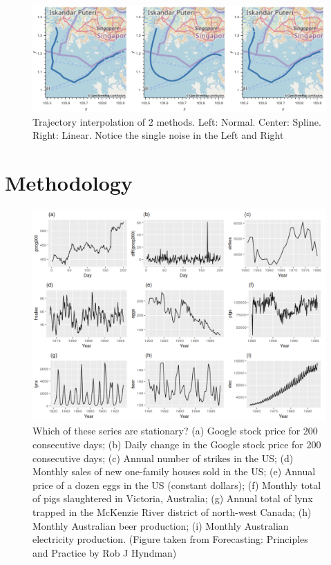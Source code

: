 \begin{figure}[t!]
    \centering
    \includegraphics[width=15cm]{pic/ch-Univariate/interpolations.png}
    \caption{Trajectory interpolation of 2 methods. Left: Normal. Center: Spline. Right: Linear. Notice the single noise in the Left and Right}
    \label{fig:interp}
\end{figure}

\section{Methodology}

\begin{figure}[t!]
    \centering
    \includegraphics[width=15cm]{pic/ch-Univariate/stationary.png}
    \caption{Which of these series are stationary? (a) Google stock price for 200 consecutive days; (b) Daily change in the Google stock price for 200 consecutive days; (c) Annual number of strikes in the US; (d) Monthly sales of new one-family houses sold in the US; (e) Annual price of a dozen eggs in the US (constant dollars); (f) Monthly total of pigs slaughtered in Victoria, Australia; (g) Annual total of lynx trapped in the McKenzie River district of north-west Canada; (h) Monthly Australian beer production; (i) Monthly Australian electricity production. (Figure taken from Forecasting: Principles and Practice by Rob J Hyndman)}
    \label{fig:stationary}
\end{figure}

